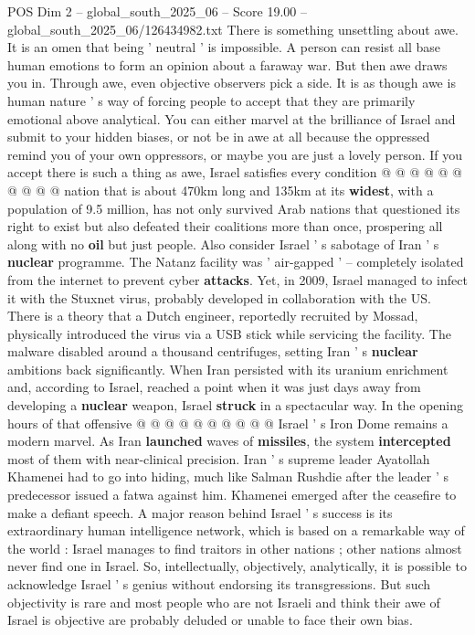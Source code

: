 \begin{textsample}{POS Dim 2 – global\_south\_2025\_06 – Score 19.00 – global\_south\_2025\_06/126434982.txt}
There is something unsettling about awe.
It is an omen that being ' neutral ' is impossible.
A person can resist all base human emotions to form an opinion about a faraway war.
But then awe draws you in.
Through awe, even objective observers pick a side.
It is as though awe is human nature ' s way of forcing people to accept that they are primarily emotional above analytical.
You can either marvel at the brilliance of Israel and submit to your hidden biases, or not be in awe at all because the oppressed remind you of your own oppressors, or maybe you are just a lovely person.
If you accept there is such a thing as awe, Israel satisfies every condition @ @ @ @ @ @ @ @ @ @ nation that is about 470km long and 135km at its \textbf{widest}, with a population of 9.5 million, has not only survived Arab nations that questioned its right to exist but also defeated their coalitions more than once, prospering all along with no \textbf{oil} but just people.
Also consider Israel ' s sabotage of Iran ' s \textbf{nuclear} programme.
The Natanz facility was ' air-gapped ' -- completely isolated from the internet to prevent cyber \textbf{attacks}.
Yet, in 2009, Israel managed to infect it with the Stuxnet virus, probably developed in collaboration with the US.
There is a theory that a Dutch engineer, reportedly recruited by Mossad, physically introduced the virus via a USB stick while servicing the facility.
The malware disabled around a thousand centrifuges, setting Iran ' s \textbf{nuclear} ambitions back significantly.
When Iran persisted with its uranium enrichment and, according to Israel, reached a point when it was just days away from developing a \textbf{nuclear} weapon, Israel \textbf{struck} in a spectacular way.
In the opening hours of that offensive @ @ @ @ @ @ @ @ @ @ Israel ' s Iron Dome remains a modern marvel.
As Iran \textbf{launched} waves of \textbf{missiles}, the system \textbf{intercepted} most of them with near-clinical precision.
Iran ' s supreme leader Ayatollah Khamenei had to go into hiding, much like Salman Rushdie after the leader ' s predecessor issued a fatwa against him.
Khamenei emerged after the ceasefire to make a defiant speech.
A major reason behind Israel ' s success is its extraordinary human intelligence network, which is based on a remarkable way of the world : Israel manages to find traitors in other nations ; other nations almost never find one in Israel.
So, intellectually, objectively, analytically, it is possible to acknowledge Israel ' s genius without endorsing its transgressions.
But such objectivity is rare and most people who are not Israeli and think their awe of Israel is objective are probably deluded or unable to face their own bias.

\end{textsample}

